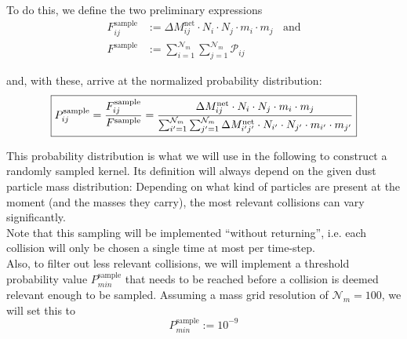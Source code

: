     To do this, we define the two preliminary expressions 
    \begin{align}
        F_{ij}^\text{sample} 
            &:= \Delta M_{ij}^\text{net} \cdot N_i \cdot N_j \cdot m_i \cdot m_j 
        \ \ \ \ \text{and} \\
        F^\text{sample} 
            &:= \sum_{i=1}^{\mathcal N_m} \sum_{j=1}^{\mathcal N_m} \mathcal P_{ij}
    \end{align}

    and, with these, arrive at the normalized probability distribution: 
    \begin{align}
        \boxed{
        P_{ij}^\text{sample} 
            = \frac{F_{ij}^\text{sample}}{F^\text{sample}} 
            = \frac{
                \Delta M_{ij}^\text{net} \cdot N_i \cdot N_j \cdot m_i \cdot m_j
            }{
                \sum_{i'=1}^{\mathcal N_m} \sum_{j'=1}^{\mathcal N_m} 
                \Delta M_{i'j'}^\text{net} \cdot N_{i'} \cdot N_{j'} 
                \cdot m_{i'} \cdot m_{j'}
            }
        }
    \end{align}

    This probability distribution is what we will use in the following to construct a randomly
    sampled kernel. Its definition will always depend on the given dust particle mass 
    distribution: Depending on 
    what kind of particles are present at the moment (and the masses they carry), the most 
    relevant collisions can vary significantly. \\ 

    Note that this sampling will be implemented ``without returning'', i.e. each collision 
    will only be chosen a single time at most per time-step. \\

    Also, to filter out less relevant collisions, we will implement a threshold probability 
    value $P^\text{sample}_{min}$ that needs to be reached before a collision is deemed relevant 
    enough to be sampled. Assuming a mass grid resolution of $\mathcal N_m=100$, we will set this to
    \begin{equation}
        P^\text{sample}_{min} := 10^{-9}
    \end{equation}

